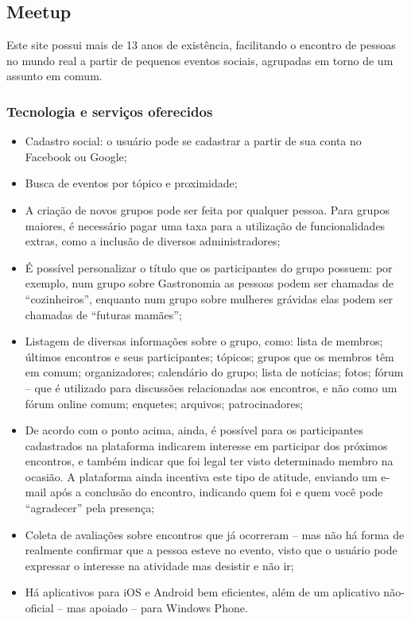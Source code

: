 \documentclass[12pt,a4paper,twoside,hyphens,english,brazil]{abntex2}
\begin{document}
\subsection{Meetup} \label{sec:concorrencia:meetup:tec}
Este site possui mais de 13 anos de existência, facilitando o encontro de pessoas no mundo real a partir de pequenos eventos sociais, agrupadas em torno de um assunto em comum.

\subsubsection*{Tecnologia e serviços oferecidos}
\begin{itemize}[itemsep=-1ex]
	\item Cadastro social: o usuário pode se cadastrar a partir de sua conta no Facebook ou Google;
	\item Busca de eventos por tópico e proximidade;
	\item A criação de novos grupos pode ser feita por qualquer pessoa. Para grupos maiores, é necessário pagar uma taxa para a utilização de funcionalidades extras, como a inclusão de diversos administradores;
	\item É possível personalizar o título que os participantes do grupo possuem: por exemplo, num grupo sobre Gastronomia as pessoas podem ser chamadas de ``cozinheiros'', enquanto num grupo sobre mulheres grávidas elas podem ser chamadas de ``futuras mamães'';
	\item Listagem de diversas informações sobre o grupo, como: lista de membros; últimos encontros e seus participantes; tópicos; grupos que os membros têm em comum; organizadores; calendário do grupo; lista de notícias; fotos; fórum -- que é utilizado para discussões relacionadas aos encontros, e não como um fórum online comum; enquetes; arquivos; patrocinadores;
	\item De acordo com o ponto acima, ainda, é possível para os participantes cadastrados na plataforma indicarem interesse em participar dos próximos encontros, e também indicar que foi legal ter visto determinado membro na ocasião. A plataforma ainda incentiva este tipo de atitude, enviando um e-mail após a conclusão do encontro, indicando quem foi e quem você pode ``agradecer'' pela presença;
	\item Coleta de avaliações sobre encontros que já ocorreram -- mas não há forma de realmente confirmar que a pessoa esteve no evento, visto que o usuário pode expressar o interesse na atividade mas desistir e não ir;
	\item Há aplicativos para iOS e Android bem eficientes, além de um aplicativo não-oficial -- mas apoiado -- para Windows Phone.
\end{itemize}
\end{document}

